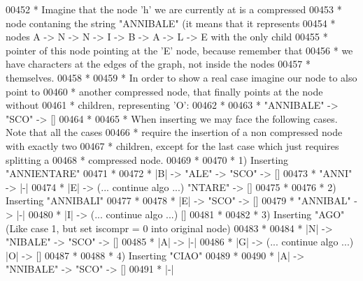 \begin{DoxyCode}
{{{00452 \textcolor{comment}{     * Imagine that the node 'h' we are currently at is a compressed}
00453 \textcolor{comment}{     * node contaning the string "ANNIBALE" (it means that it represents}
00454 \textcolor{comment}{     * nodes A -> N -> N -> I -> B -> A -> L -> E with the only child}
00455 \textcolor{comment}{     * pointer of this node pointing at the 'E' node, because remember that}
00456 \textcolor{comment}{     * we have characters at the edges of the graph, not inside the nodes}
00457 \textcolor{comment}{     * themselves.}
00458 \textcolor{comment}{     *}
00459 \textcolor{comment}{     * In order to show a real case imagine our node to also point to}
00460 \textcolor{comment}{     * another compressed node, that finally points at the node without}
00461 \textcolor{comment}{     * children, representing 'O':}
00462 \textcolor{comment}{     *}
00463 \textcolor{comment}{     *     "ANNIBALE" -> "SCO" -> []}
00464 \textcolor{comment}{     *}
00465 \textcolor{comment}{     * When inserting we may face the following cases. Note that all the cases}
00466 \textcolor{comment}{     * require the insertion of a non compressed node with exactly two}
00467 \textcolor{comment}{     * children, except for the last case which just requires splitting a}
00468 \textcolor{comment}{     * compressed node.}
00469 \textcolor{comment}{     *}
00470 \textcolor{comment}{     * 1) Inserting "ANNIENTARE"}
00471 \textcolor{comment}{     *}
00472 \textcolor{comment}{     *               |B| -> "ALE" -> "SCO" -> []}
00473 \textcolor{comment}{     *     "ANNI" -> |-|}
00474 \textcolor{comment}{     *               |E| -> (... continue algo ...) "NTARE" -> []}
00475 \textcolor{comment}{     *}
00476 \textcolor{comment}{     * 2) Inserting "ANNIBALI"}
00477 \textcolor{comment}{     *}
00478 \textcolor{comment}{     *                  |E| -> "SCO" -> []}
00479 \textcolor{comment}{     *     "ANNIBAL" -> |-|}
00480 \textcolor{comment}{     *                  |I| -> (... continue algo ...) []}
00481 \textcolor{comment}{     *}
00482 \textcolor{comment}{     * 3) Inserting "AGO" (Like case 1, but set iscompr = 0 into original node)}
00483 \textcolor{comment}{     *}
00484 \textcolor{comment}{     *            |N| -> "NIBALE" -> "SCO" -> []}
00485 \textcolor{comment}{     *     |A| -> |-|}
00486 \textcolor{comment}{     *            |G| -> (... continue algo ...) |O| -> []}
00487 \textcolor{comment}{     *}
00488 \textcolor{comment}{     * 4) Inserting "CIAO"}
00489 \textcolor{comment}{     *}
00490 \textcolor{comment}{     *     |A| -> "NNIBALE" -> "SCO" -> []}
00491 \textcolor{comment}{     *     |-|}
}}}
\end{DoxyCode}
